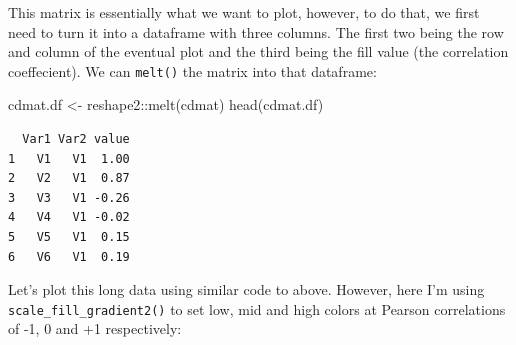 \documentclass[
  letterpaper,
  DIV=11,
  numbers=noendperiod]{scrreprt}
\newenvironment{Shaded}{\begin{snugshade}}{\end{snugshade}}
\newcommand{\FunctionTok}[1]{\textcolor[rgb]{0.28,0.35,0.67}{#1}}
\newcommand{\NormalTok}[1]{\textcolor[rgb]{0.00,0.23,0.31}{#1}}
\newcommand{\OtherTok}[1]{\textcolor[rgb]{0.00,0.23,0.31}{#1}}
\newcommand{\SpecialCharTok}[1]{\textcolor[rgb]{0.37,0.37,0.37}{#1}}
\begin{document}
This matrix is essentially what we want to plot, however, to do that, we
first need to turn it into a dataframe with three columns. The first two
being the row and column of the eventual plot and the third being the
fill value (the correlation coeffecient). We can \texttt{melt()} the
matrix into that dataframe:

\begin{Shaded}
\begin{Highlighting}[]
\NormalTok{cdmat.df }\OtherTok{\textless{}{-}}\NormalTok{ reshape2}\SpecialCharTok{::}\FunctionTok{melt}\NormalTok{(cdmat)}
\FunctionTok{head}\NormalTok{(cdmat.df)}
\end{Highlighting}
\end{Shaded}

\begin{verbatim}
  Var1 Var2 value
1   V1   V1  1.00
2   V2   V1  0.87
3   V3   V1 -0.26
4   V4   V1 -0.02
5   V5   V1  0.15
6   V6   V1  0.19
\end{verbatim}

Let's plot this long data using similar code to above. However, here I'm
using \texttt{scale\_fill\_gradient2()} to set low, mid and high colors
at Pearson correlations of -1, 0 and +1 respectively:
\end{document}
